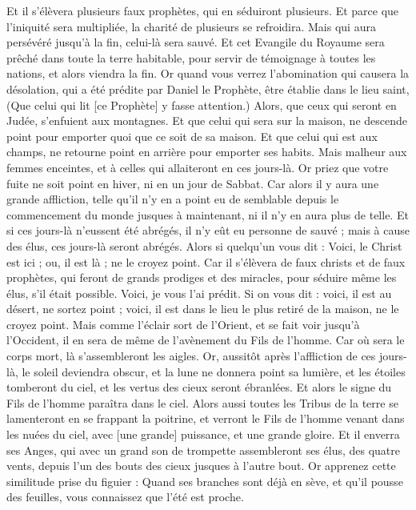 \begin{multicols}{2}
Et il s'élèvera plusieurs faux prophètes, qui en séduiront plusieurs.
Et parce que l'iniquité sera multipliée, la charité de plusieurs se refroidira.
Mais qui aura persévéré jusqu'à la fin, celui-là sera sauvé.
Et cet Evangile du Royaume sera prêché dans toute la terre habitable, pour servir de témoignage à toutes les nations, et alors viendra la fin.
Or quand vous verrez l'abomination qui causera la désolation, qui a été prédite par Daniel le Prophète, être établie dans le lieu saint, (Que celui qui lit [ce Prophète] y fasse attention.)
Alors, que ceux qui seront en Judée, s'enfuient aux montagnes.
Et que celui qui sera sur la maison, ne descende point pour emporter quoi que ce soit de sa maison.
Et que celui qui est aux champs, ne retourne point en arrière pour emporter ses habits.
Mais malheur aux femmes enceintes, et à celles qui allaiteront en ces jours-là.
Or priez que votre fuite ne soit point en hiver, ni en un jour de Sabbat.
Car alors il y aura une grande affliction, telle qu'il n'y en a point eu de semblable depuis le commencement du monde jusques à maintenant, ni il n'y en aura plus de telle.
Et si ces jours-là n'eussent été abrégés, il n'y eût eu personne de sauvé ; mais à cause des élus, ces jours-là seront abrégés.
Alors si quelqu'un vous dit : Voici, le Christ est ici ; ou, il est là ; ne le croyez point.
Car il s'élèvera de faux christs et de faux prophètes, qui feront de grands prodiges et des miracles, pour séduire même les élus, s'il était possible.
Voici, je vous l'ai prédit.
Si on vous dit : voici, il est au désert, ne sortez point ; voici, il est dans le lieu le plus retiré de la maison, ne le croyez point.
Mais comme l'éclair sort de l'Orient, et se fait voir jusqu'à l'Occident, il en sera de même de l'avènement du Fils de l'homme.
Car où sera le corps mort, là s'assembleront les aigles.
Or, aussitôt après l'affliction de ces jours-là, le soleil deviendra obscur, et la lune ne donnera point sa lumière, et les étoiles tomberont du ciel, et les vertus des cieux seront ébranlées.
Et alors le signe du Fils de l'homme paraîtra dans le ciel. Alors aussi toutes les Tribus de la terre se lamenteront en se frappant la poitrine, et verront le Fils de l'homme venant dans les nuées du ciel, avec [une grande] puissance, et une grande gloire.
Et il enverra ses Anges, qui avec un grand son de trompette assembleront ses élus, des quatre vents, depuis l'un des bouts des cieux jusques à l'autre bout.
Or apprenez cette similitude prise du figuier : Quand ses branches sont déjà en sève, et qu'il pousse des feuilles, vous connaissez que l'été est proche.

\end{multicols}
